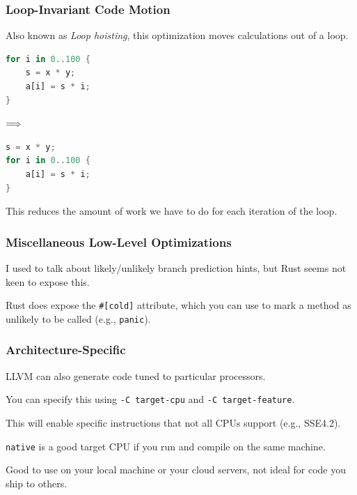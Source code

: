 \begin{frame}[fragile]
\frametitle{Loop-Invariant Code Motion}

 Also known as \emph{Loop hoisting},
this optimization moves calculations out of a loop. 
\begin{center}
\vspace*{-1em}
\begin{minipage}{.3\textwidth}
  \begin{lstlisting}[language=Rust]
for i in 0..100 {
    s = x * y;
    a[i] = s * i;
}
  \end{lstlisting}
  \end{minipage} $\Longrightarrow \hspace*{2em}$ \begin{minipage}{.4\textwidth}
  \begin{lstlisting}[language=Rust]
s = x * y;
for i in 0..100 {
    a[i] = s * i;
}
  \end{lstlisting}
  \end{minipage}
  \end{center}


This reduces the amount of work we have to do for each iteration of the loop.

\end{frame}


\begin{frame}[fragile]
\frametitle{Miscellaneous Low-Level Optimizations}

I used to talk about likely/unlikely branch prediction hints,
but Rust seems not keen to expose this. 

Rust does expose the \verb+#[cold]+
attribute, which you can use to mark a method as unlikely to be called (e.g., \texttt{panic}).


\end{frame}


\begin{frame}
\frametitle{Architecture-Specific}

LLVM can also generate code tuned to particular
processors. 

 You can specify this using {\tt -C target-cpu} and {\tt -C target-feature}.

This will enable specific instructions that not all CPUs support (e.g., SSE4.2).

{\tt native} is a good target CPU if you run and compile on the same machine.

\noindent
Good to use on your local machine or your cloud servers, not ideal for code you ship to others.


\end{frame}



